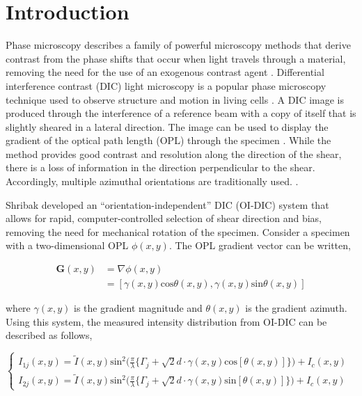 \documentclass[aps, secnumarabic, amssymb, notitlepage]{article}
\begin{document}


\section{Introduction}

Phase microscopy describes a family of powerful microscopy methods that derive contrast from the phase shifts that occur when light travels through a material, removing the need for the use of an exogenous contrast agent \cite{physicstoday}. Differential interference contrast (DIC) light microscopy is a popular phase microscopy technique used to observe structure and motion in living cells \cite{shribakbook, shribak, microbook}. A DIC image is produced through the interference of a reference beam with a copy of itself that is slightly sheared in a lateral direction. The image can be used to display the gradient of the optical path length (OPL) through the specimen \cite{shribakbook, shribak}. While the method provides good contrast and resolution along the direction of the shear, there is a loss of information in the direction perpendicular to the shear. Accordingly, multiple azimuthal orientations are traditionally used. \cite{shribakbook, shribak}.

Shribak \cite{shribak} developed an ``orientation-independent'' DIC (OI-DIC) system that allows for rapid, computer-controlled selection of shear direction and bias, removing the need for mechanical rotation of the specimen. Consider a specimen with a two-dimensional OPL $\phi(x,y)$. The OPL gradient vector can be written,

\begin{align}
  \nonumber \bm{G}(x,y) &= \nabla\phi(x,y)\\
              &= [\gamma(x,y) \text{cos}\theta(x,y), \gamma(x,y) \text{sin}\theta(x,y)]
\end{align}

\noindent where $\gamma(x,y)$ is the gradient magnitude and $\theta(x,y)$ is the gradient azimuth. Using this system, the measured intensity distribution from OI-DIC can be described as follows,

\begin{equation}
  \begin{cases}
    I_{1j}(x,y) = \tilde{I}(x,y) \text{sin}^2 \Big( \frac{\pi}{\lambda} \Big\{ \Gamma_j + \sqrt{2} d \cdot \gamma(x,y) \text{cos}[\theta(x,y)] \Big\} \Big) + I_c(x,y) & \\[10pt]
    I_{2j}(x,y) = \tilde{I}(x,y) \text{sin}^2 \Big( \frac{\pi}{\lambda} \Big\{ \Gamma_j + \sqrt{2} d \cdot \gamma(x,y) \text{sin}[\theta(x,y)] \Big\} \Big) + I_c(x,y) & 
  \end{cases}
  \label{eq:model}
\end{equation}
\end{document}
